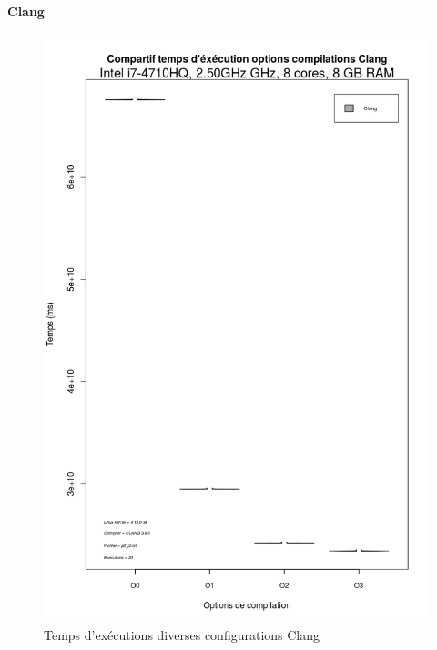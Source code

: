 \documentclass[
 aip,
 jmp,
 amsmath,amssymb,
 reprint
]{revtex4-1}
\begin{document}
\paragraph{Clang}
\begin{figure}[ht]
  \caption{Temps d'exécutions diverses configurations Clang}
  \includegraphics[width=\linewidth, keepaspectratio=true]{CLANG.png}
\end{figure}
\end{document}
